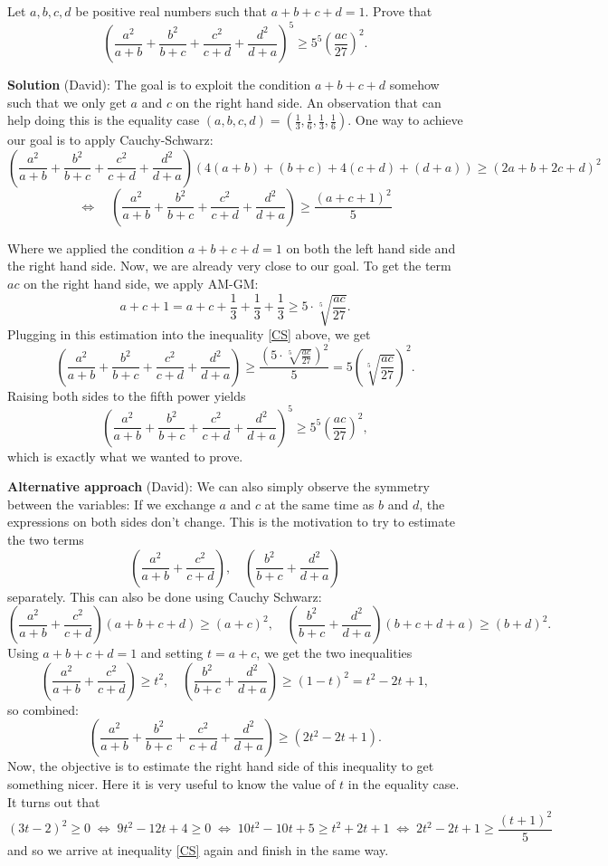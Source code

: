 Let $a,b,c,d$ be positive real numbers such that $a+b+c+d=1$. Prove that 
\[
\left( \frac{a^2}{a+b}+\frac{b^2}{b+c}+\frac{c^2}{c+d}+\frac{d^2}{d+a}\right)^5 \geq 5^5\left(\frac{ac}{27}\right)^2.
\]

\textbf{Solution} (David):
The goal is to exploit the condition $a+b+c+d$ somehow such that we only get $a$ and $c$ on the right hand side. An observation that can help doing this is the equality case $(a,b,c,d) = (\frac{1}{3},\frac{1}{6},\frac{1}{3},\frac{1}{6})$. One way to achieve our goal is to apply Cauchy-Schwarz:
\vspace{2mm}
\[
\left( \frac{a^2}{a+b}+\frac{b^2}{b+c}+\frac{c^2}{c+d}+\frac{d^2}{d+a}\right) \left( 4(a+b) + (b+c) + 4(c+d) + (d+a) \right) \geq \left(2a + b + 2c + d \right)^2
\]
\begin{equation}
\label{CS}
\Leftrightarrow \quad \left( \frac{a^2}{a+b}+\frac{b^2}{b+c}+\frac{c^2}{c+d}+\frac{d^2}{d+a}\right) \geq \frac{(a+c+1)^2}{5}
\end{equation} 

Where we applied the condition $a+b+c+d = 1$ on both the left hand side and the right hand side. Now, we are already very close to our goal. To get the term $ac$ on the right hand side, we apply AM-GM:
\[
a+c+1 = a + c + \frac{1}{3} + \frac{1}{3} + \frac{1}{3} \geq 5 \cdot \sqrt[5]{\frac{ac}{27}}.
\]
Plugging in this estimation into the inequality \eqref{CS} above, we get
\[
\left( \frac{a^2}{a+b}+\frac{b^2}{b+c}+\frac{c^2}{c+d}+\frac{d^2}{d+a}\right) \geq \frac{(5 \cdot \sqrt[5]{\frac{ac}{27}})^2}{5} = 5 \left( \sqrt[5]{\frac{ac}{27}} \right)^2. 
\]
Raising both sides to the fifth power yields 
\[
\left( \frac{a^2}{a+b}+\frac{b^2}{b+c}+\frac{c^2}{c+d}+\frac{d^2}{d+a}\right)^5 \geq 5^5\left(\frac{ac}{27}\right)^2,
\]
which is exactly what we wanted to prove.
\vspace{3mm}

\textbf{Alternative approach} (David): We can also simply observe the symmetry between the variables: If we exchange $a$ and $c$ at the same time as $b$ and $d$, the expressions on both sides don't change. This is the motivation to try to estimate the two terms
\[
\left( \frac{a^2}{a+b}+\frac{c^2}{c+d} \right), \quad \left(\frac{b^2}{b+c}+\frac{d^2}{d+a}\right)
\]
separately. This can also be done using Cauchy Schwarz:
\[
\left( \frac{a^2}{a+b}+\frac{c^2}{c+d} \right)(a+b+c+d) \geq (a+c)^2, \quad \left(\frac{b^2}{b+c}+\frac{d^2}{d+a}\right)(b+c+d+a) \geq (b+d)^2.
\]
Using $a+b+c+d=1$ and setting $t=a+c$, we get the two inequalities
\[
\left( \frac{a^2}{a+b}+\frac{c^2}{c+d} \right) \geq t^2, \quad \left(\frac{b^2}{b+c}+\frac{d^2}{d+a}\right) \geq (1-t)^2 = t^2 - 2t + 1,
\]
so combined:
\[
\left( \frac{a^2}{a+b}+\frac{b^2}{b+c}+\frac{c^2}{c+d}+\frac{d^2}{d+a}\right) \geq (2t^2 - 2t + 1).
\]
Now, the objective is to estimate the right hand side of this inequality to get something nicer. Here it is very useful to know the value of $t$ in the equality case. It turns out that 
\[
(3t-2)^2 \geq 0 \; \Leftrightarrow \; 9t^2 - 12t + 4 \geq 0 \; \Leftrightarrow \; 10t^2 - 10t + 5 \geq t^2 + 2t + 1 \; \Leftrightarrow \; 2t^2-2t+1 \geq \frac{(t+1)^2}{5} 
\]
and so we arrive at inequality \eqref{CS} again and finish in the same way.
\newpage

